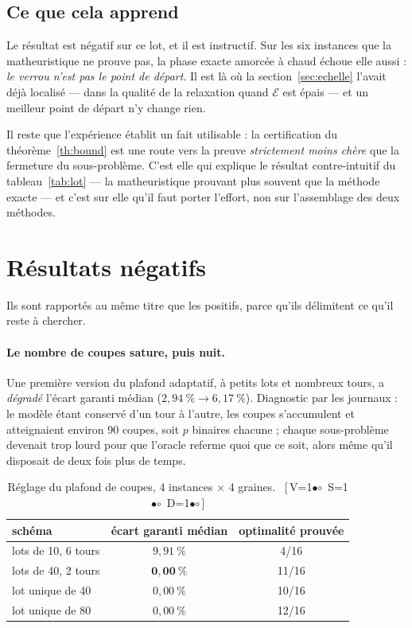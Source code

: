 \documentclass[11pt,a4paper]{article}
\theoremstyle{plain}
\theoremstyle{remark}
\newcommand{\Ecal}{\mathcal{E}}
\newcommand{\cfgm}[1]{\ifnum#1=1$\bullet$\else$\circ$\fi}
\newcommand{\conf}[3]{%
  \textsf{\footnotesize[\,V\cfgm{#1}\ S\cfgm{#2}\ D\cfgm{#3}\,]}}
\begin{document}
\subsection{Ce que cela apprend}

Le résultat est négatif sur ce lot, et il est instructif. Sur les six
instances que la matheuristique ne prouve pas, la phase exacte amorcée à
chaud échoue elle aussi : \emph{le verrou n'est pas le point de départ}. Il
est là où la section~\ref{sec:echelle} l'avait déjà localisé --- dans la
qualité de la relaxation quand $\Ecal$ est épais --- et un meilleur point de
départ n'y change rien.

Il reste que l'expérience établit un fait utilisable : la certification du
théorème~\ref{th:bound} est une route vers la preuve \emph{strictement moins
chère} que la fermeture du sous-problème. C'est elle qui explique le
résultat contre-intuitif du tableau~\ref{tab:lot} --- la matheuristique
prouvant plus souvent que la méthode exacte --- et c'est sur elle qu'il faut
porter l'effort, non sur l'assemblage des deux méthodes.

\section{Résultats négatifs}
\label{sec:negatif}

Ils sont rapportés au même titre que les positifs, parce qu'ils délimitent ce
qu'il reste à chercher.

\paragraph{Le nombre de coupes sature, puis nuit.} Une première version du
plafond adaptatif, à petits lots et nombreux tours, a \emph{dégradé} l'écart
garanti médian ($2{,}94\ \%\to 6{,}17\ \%$). Diagnostic par les journaux : le
modèle étant conservé d'un tour à l'autre, les coupes s'accumulent et
atteignaient environ 90 coupes, soit $p$ binaires chacune ; chaque
sous-problème devenait trop lourd pour que l'oracle referme quoi que ce soit,
alors même qu'il disposait de deux fois plus de temps.

\begin{table}[H]
\centering
\caption{Réglage du plafond de coupes, 4 instances $\times$ 4 graines.\ \conf{0}{0}{0}}
\begin{tabular}{lcc}
\toprule
schéma & écart garanti médian & optimalité prouvée\\
\midrule
lots de 10, 6 tours & $9{,}91\ \%$ & 4/16\\
lots de 40, 2 tours & $\mathbf{0{,}00\ \%}$ & 11/16\\
lot unique de 40 & $0{,}00\ \%$ & 10/16\\
lot unique de 80 & $0{,}00\ \%$ & 12/16\\
\bottomrule
\end{tabular}
\end{table}
\end{document}
